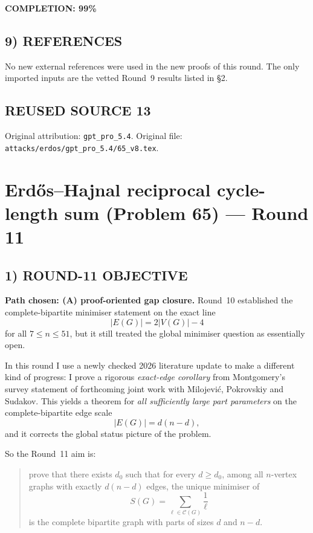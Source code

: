 \textbf{COMPLETION: 99\%}

\subsection*{9) REFERENCES}

No new external references were used in the new proofs of this round. The only imported inputs are the vetted Round~9 results listed in \S2.


\subsection*{REUSED SOURCE 13}
Original attribution: \texttt{gpt\_pro\_5.4}.
Original file: \texttt{attacks/erdos/gpt\_pro\_5.4/65\_v8.tex}.

\section{Erd\H{o}s--Hajnal reciprocal cycle-length sum (Problem 65) --- Round 11}

\subsection*{1) ROUND-11 OBJECTIVE}

\textbf{Path chosen: (A) proof-oriented gap closure.}
Round~10 established the complete-bipartite minimiser statement on the exact line
\[
|E(G)|=2|V(G)|-4
\]
for all $7\le n\le 51$, but it still treated the global minimiser question as essentially open.

In this round I use a newly checked 2026 literature update to make a different kind of progress: I prove a rigorous \emph{exact-edge corollary} from Montgomery's survey statement of forthcoming joint work with Milojevi\'c, Pokrovskiy and Sudakov. This yields a theorem for \emph{all sufficiently large part parameters} on the complete-bipartite edge scale
\[
|E(G)|=d(n-d),
\]
and it corrects the global status picture of the problem.

So the Round~11 aim is:
\begin{quote}
prove that there exists $d_0$ such that for every $d\ge d_0$, among all $n$-vertex graphs with exactly $d(n-d)$ edges, the unique minimiser of
\[
S(G)=\sum_{\ell\in \mathcal C(G)}\frac1\ell
\]
is the complete bipartite graph with parts of sizes $d$ and $n-d$.
\end{quote}

